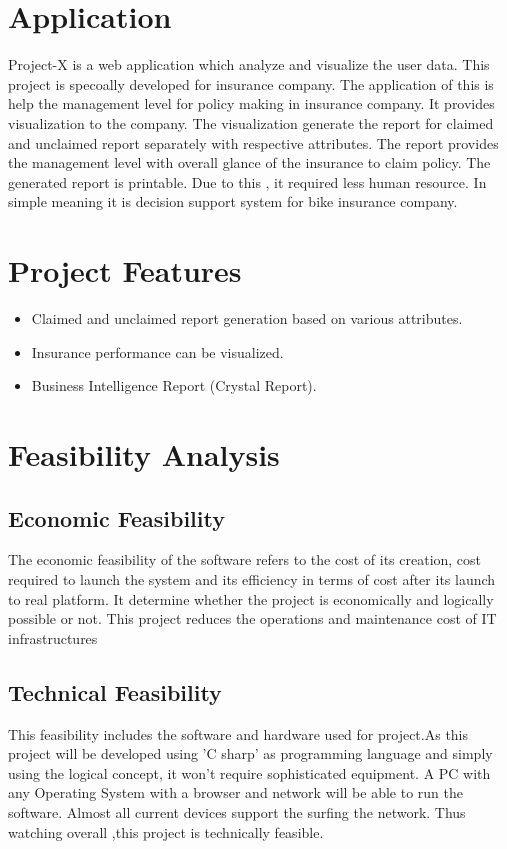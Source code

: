 \section{Application}
Project-X is a web application which analyze and visualize the user data. This project is specoally developed for insurance company. The application of this is help the  management level for policy making in insurance company. It provides visualization to the company. The visualization generate the report for claimed and unclaimed report separately with respective attributes. The report provides the management level with overall glance of the insurance to claim policy. The generated report is printable. Due to this , it required less human resource. In simple meaning it is decision support system for bike insurance company.

\section{Project Features} \label{sec:feat}
\begin{itemize}
\item Claimed and unclaimed report generation based on various attributes.
\item Insurance performance can be visualized. 
\item Business Intelligence Report (Crystal Report). 
\end{itemize}






\section{Feasibility Analysis}

\subsection{Economic Feasibility}

The economic feasibility of the software refers to the cost of its creation, cost required
to launch the system and its efficiency in terms of cost after its launch to real platform.
It determine whether the project is economically and logically possible or not.  This
project reduces the operations and maintenance cost of IT infrastructures

\subsection{Technical Feasibility}
This feasibility includes the software and hardware used for project.As this project will be developed using 'C sharp' as programming language and simply using the logical concept, it won't require sophisticated equipment. A PC with any Operating System with a browser and network will be able to run the software. Almost all current devices support the surfing the network. Thus watching overall ,this project is technically feasible.

